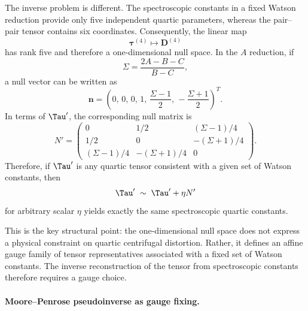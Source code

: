 The inverse problem is different.  The spectroscopic constants in a fixed
Watson reduction provide only five independent quartic parameters, whereas the
pair--pair tensor contains six coordinates.  Consequently, the linear map
\begin{equation}
\boldsymbol\tau^{(4)} \longmapsto \mathbf D^{(4)}
\end{equation}
has rank five and therefore a one-dimensional null space.  In the $A$
reduction, if
\begin{equation}
\Sigma=\frac{2A-B-C}{B-C},
\end{equation}
a null vector can be written as
\begin{equation}
\mathbf n =
\left(
0,\,
0,\,
0,\,
1,\,
\frac{\Sigma-1}{2},\,
-\frac{\Sigma+1}{2}
\right)^T.
\label{eq:quartic_null_vector}
\end{equation}
In terms of $\Tau'$, the corresponding null matrix is
\begin{equation}
N'=
\begin{pmatrix}
0 & 1/2 & (\Sigma-1)/4 \\
1/2 & 0 & -(\Sigma+1)/4 \\
(\Sigma-1)/4 & -(\Sigma+1)/4 & 0
\end{pmatrix}.
\label{eq:quartic_null_matrix}
\end{equation}
Therefore, if $\Tau'$ is any quartic tensor consistent with a given set of
Watson constants, then
\begin{equation}
\Tau' \;\sim\; \Tau' + \eta N'
\label{eq:quartic_affine_family}
\end{equation}
for arbitrary scalar $\eta$ yields exactly the same spectroscopic quartic
constants.

This is the key structural point: the one-dimensional null space does not
express a physical constraint on quartic centrifugal distortion.  Rather, it
defines an affine gauge family of tensor representatives associated with a fixed
set of Watson constants.  The inverse reconstruction of the tensor from
spectroscopic constants therefore requires a gauge choice.

\paragraph{Moore--Penrose pseudoinverse as gauge fixing.}

